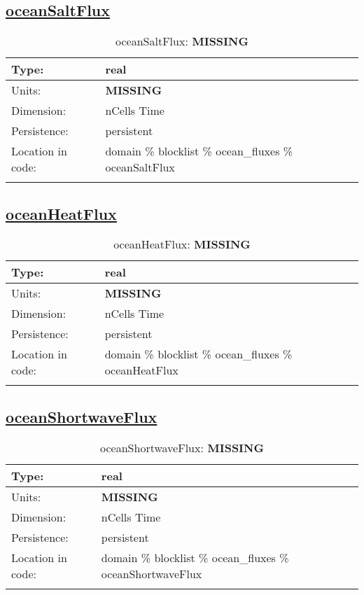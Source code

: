 \subsection[oceanSaltFlux]{\hyperref[sec:var_tab_ocean_fluxes]{oceanSaltFlux}}
\label{subsec:var_sec_ocean_fluxes_oceanSaltFlux}
\begin{center}
\begin{longtable}{| p{2.0in} | p{4.0in} |}
        \hline 
        Type: & real \\
        \hline 
        Units: & {\bf \color{red} MISSING} \\
        \hline 
        Dimension: & nCells Time \\
        \hline 
        Persistence: & persistent \\
        \hline 
         Location in code: & domain \% blocklist \% ocean\_fluxes \% oceanSaltFlux \\
         \hline 
    \caption{oceanSaltFlux: {\bf \color{red} MISSING}}
\end{longtable}
\end{center}
\subsection[oceanHeatFlux]{\hyperref[sec:var_tab_ocean_fluxes]{oceanHeatFlux}}
\label{subsec:var_sec_ocean_fluxes_oceanHeatFlux}
\begin{center}
\begin{longtable}{| p{2.0in} | p{4.0in} |}
        \hline 
        Type: & real \\
        \hline 
        Units: & {\bf \color{red} MISSING} \\
        \hline 
        Dimension: & nCells Time \\
        \hline 
        Persistence: & persistent \\
        \hline 
         Location in code: & domain \% blocklist \% ocean\_fluxes \% oceanHeatFlux \\
         \hline 
    \caption{oceanHeatFlux: {\bf \color{red} MISSING}}
\end{longtable}
\end{center}
\subsection[oceanShortwaveFlux]{\hyperref[sec:var_tab_ocean_fluxes]{oceanShortwaveFlux}}
\label{subsec:var_sec_ocean_fluxes_oceanShortwaveFlux}
\begin{center}
\begin{longtable}{| p{2.0in} | p{4.0in} |}
        \hline 
        Type: & real \\
        \hline 
        Units: & {\bf \color{red} MISSING} \\
        \hline 
        Dimension: & nCells Time \\
        \hline 
        Persistence: & persistent \\
        \hline 
         Location in code: & domain \% blocklist \% ocean\_fluxes \% oceanShortwaveFlux \\
         \hline 
    \caption{oceanShortwaveFlux: {\bf \color{red} MISSING}}
\end{longtable}
\end{center}
